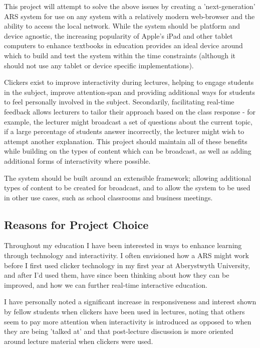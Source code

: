 \documentclass[a4papert,11pt,notitlepage]{ltxdoc}
\begin{document}
This project will attempt to solve the above issues by creating a 'next-generation' ARS system for use on any system with a relatively modern web-browser and the ability to access the local network. While the system should be platform and device agnostic, the increasing popularity of Apple's iPad and other tablet computers to enhance textbooks in education provides an ideal device around which to build and test the system within the time constraints (although it should not use any tablet or device specific implementations).

Clickers exist to improve interactivity during lectures, helping to engage students in the subject, improve attention-span and providing additional ways for students to feel personally involved in the subject. Secondarily, facilitating real-time feedback allows lecturers to tailor their approach based on the class response - for example, the lecturer might broadcast a set of questions about the current topic, if a large percentage of students answer incorrectly, the lecturer might wish to attempt another explanation. This project should maintain all of these benefits while building on the types of content which can be broadcast, as well as adding additional forms of interactivity where possible.

The system should be built around an extensible framework; allowing additional types of content to be created for broadcast, and to allow the system to be used in other use cases, such as school classrooms and business meetings. 

\subsection{Reasons for Project Choice}
Throughout my education I have been interested in ways to enhance learning through technology and interactivity. I often envisioned how a ARS might work before I first used clicker technology in my first year at Aberystwyth University, and after I'd used them, have since been thinking about how they can be improved, and how we can further real-time interactive education. 

I have personally noted a significant increase in responsiveness and interest shown by fellow students when clickers have been used in lectures, noting that others seem to pay more attention when interactivity is introduced as opposed to when they are being 'talked at' and that post-lecture discussion is more oriented around lecture material when clickers were used.
\end{document}
